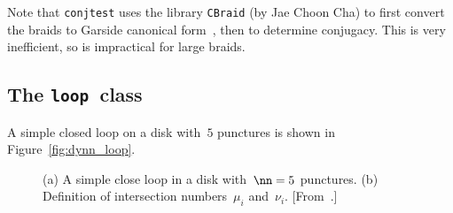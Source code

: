 \documentclass[12pt]{article}
\newcommand{\loopc}{\texttt{loop}}%
\begin{document}
Note that \lstinline{conjtest} uses the library \texttt{CBraid} (by
Jae Choon Cha) to first convert the braids to Garside canonical
form~\citep{Birman2005}, then to determine conjugacy.  This is very
inefficient, so is impractical for large braids.


\subsection{The \loopc\ class}
\label{sec:loop}

A simple closed loop on a disk with~$5$ punctures is shown in
Figure~\ref{fig:dynn_loop}.
%
\begin{figure}
\begin{center}
\hspace{1em}
\end{center}
\caption{(a) A simple close loop in a disk with~$\nn=5$ punctures.
  (b) Definition of intersection numbers~$\mu_i$ and~$\nu_i$.
  [From~\citet{Thiffeault2010}.]}
\end{figure}
\end{document}
